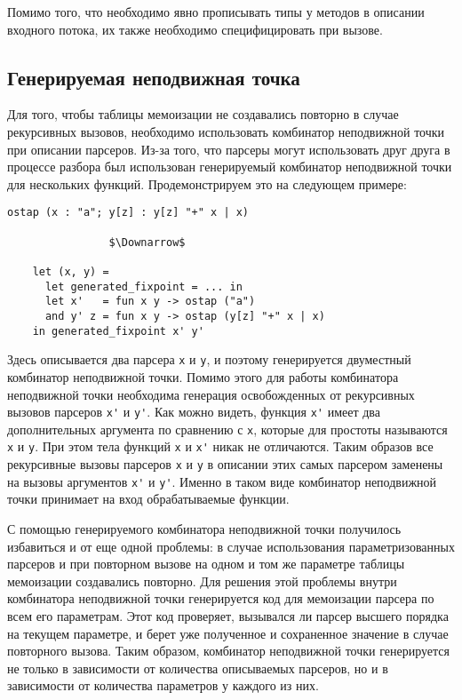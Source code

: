\documentclass[conference]{IEEEtran}
\begin{document}
Помимо того, что необходимо явно прописывать типы у методов в описании входного потока, их также необходимо специфицировать при вызове.

\subsection{Генерируемая неподвижная точка}

Для того, чтобы таблицы мемоизации не создавались повторно в случае рекурсивных вызовов, необходимо использовать комбинатор неподвижной точки при описании парсеров.
Из-за того, что парсеры могут использовать друг друга в процессе разбора был использован генерируемый комбинатор неподвижной точки для нескольких функций. Продемонстрируем
это на следующем примере:

\begin{lstlisting}[basicstyle=\small]
    ostap (x : "a"; y[z] : y[z] "+" x | x)

                $\Downarrow$

    let (x, y) =
      let generated_fixpoint = ... in
      let x'   = fun x y -> ostap ("a")
      and y' z = fun x y -> ostap (y[z] "+" x | x)
    in generated_fixpoint x' y'
\end{lstlisting}

Здесь описывается два парсера \lstinline|x| и \lstinline|y|, и поэтому генерируется двуместный комбинатор неподвижной точки. Помимо этого для работы комбинатора неподвижной
точки необходима генерация освобожденных от рекурсивных вызовов парсеров \lstinline|x'| и \lstinline|y'|. Как можно видеть, функция \lstinline|x'| имеет два дополнительных
аргумента по сравнению с \lstinline|x|, которые для простоты называются \lstinline|х| и \lstinline|у|. При этом тела функций \lstinline|х| и \lstinline|x'| никак не отличаются.
Таким образов все рекурсивные вызовы парсеров \lstinline|x| и \lstinline|y| в описании этих самых парсером заменены на вызовы аргументов \lstinline|x'| и  \lstinline|y'|.
Именно в таком виде комбинатор неподвижной точки принимает на вход обрабатываемые функции.

С помощью генерируемого комбинатора неподвижной точки получилось избавиться и от еще одной проблемы: в случае использования параметризованных парсеров и при повторном вызове на
одном и том же параметре таблицы мемоизации создавались повторно. Для решения этой проблемы внутри комбинатора неподвижной точки генерируется код для мемоизации парсера по всем
его параметрам. Этот код проверяет, вызывался ли парсер высшего порядка на текущем параметре, и берет уже полученное и сохраненное значение в случае повторного вызова.
Таким образом, комбинатор неподвижной точки генерируется не только в зависимости от количества описываемых парсеров, но и в зависимости от количества параметров у каждого из них.
\end{document}
